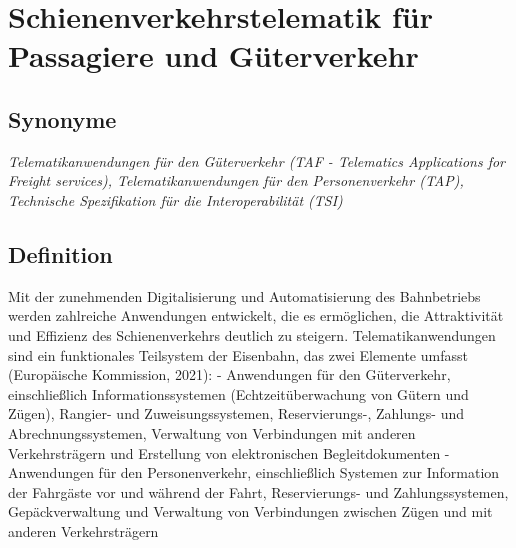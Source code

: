 \documentclass[
]{book}
\begin{document}
\hypertarget{rail_telematics}{%
\section{Schienenverkehrstelematik für Passagiere und Güterverkehr}\label{rail_telematics}}

\hypertarget{synonyme-23}{%
\subsection*{Synonyme}\label{synonyme-23}}

\emph{Telematikanwendungen für den Güterverkehr (TAF - Telematics Applications for Freight services), Telematikanwendungen für den Personenverkehr (TAP), Technische Spezifikation für die Interoperabilität (TSI)}

\hypertarget{definition-29}{%
\subsection*{Definition}\label{definition-29}}

Mit der zunehmenden Digitalisierung und Automatisierung des Bahnbetriebs werden zahlreiche Anwendungen entwickelt, die es ermöglichen, die Attraktivität und Effizienz des Schienenverkehrs deutlich zu steigern. Telematikanwendungen sind ein funktionales Teilsystem der Eisenbahn, das zwei Elemente umfasst (Europäische Kommission, 2021):
- Anwendungen für den Güterverkehr, einschließlich Informationssystemen (Echtzeitüberwachung von Gütern und Zügen), Rangier- und Zuweisungssystemen, Reservierungs-, Zahlungs- und Abrechnungssystemen, Verwaltung von Verbindungen mit anderen Verkehrsträgern und Erstellung von elektronischen Begleitdokumenten
- Anwendungen für den Personenverkehr, einschließlich Systemen zur Information der Fahrgäste vor und während der Fahrt, Reservierungs- und Zahlungssystemen, Gepäckverwaltung und Verwaltung von Verbindungen zwischen Zügen und mit anderen Verkehrsträgern
\end{document}
